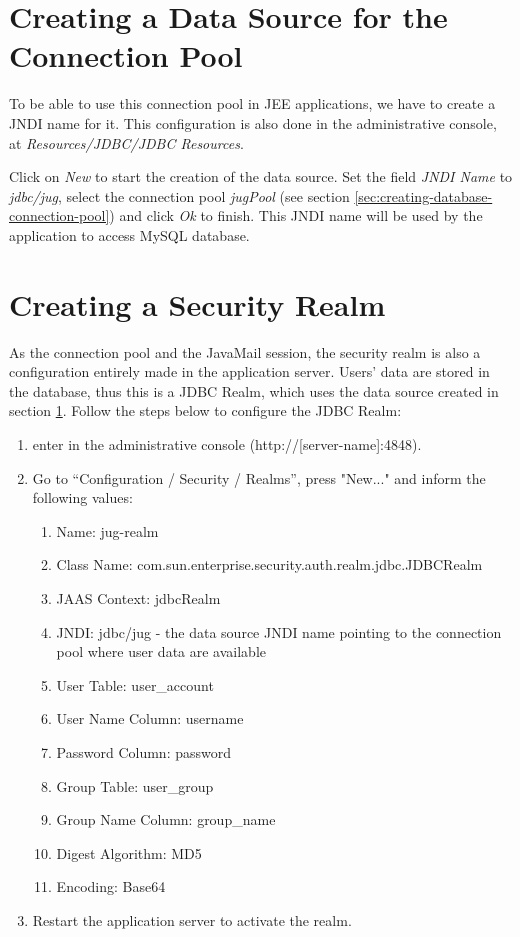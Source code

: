 \documentclass[envcountsame,envcountchap]{svmono}
\begin{document}
\section{Creating a Data Source for the Connection Pool}
\label{sec:creating-data-source-connection-pool}

To be able to use this connection pool in JEE applications, we have to create a JNDI name for it. This configuration is also done in the administrative console, at \textit{Resources/JDBC/JDBC Resources}.

Click on \textit{New} to start the creation of the data source. Set the field \textit{JNDI Name} to \textit{jdbc/jug}, select the connection pool \textit{jugPool} (see section \ref{sec:creating-database-connection-pool}) and click \textit{Ok} to finish. This JNDI name will be used by the application to access MySQL database.

\section{Creating a Security Realm}

As the connection pool and the JavaMail session, the security realm is also a configuration entirely made in the application server. Users' data are stored in the database, thus this is a JDBC Realm, which uses the data source created in section \ref{sec:creating-data-source-connection-pool}. Follow the steps below to configure the JDBC Realm: 

\begin{enumerate}
\item enter in the administrative console (http://[server-name]:4848).
\item Go to “Configuration / Security / Realms”, press "New..." and inform the following values:
   \begin{enumerate}
   \item Name: jug-realm
   \item Class Name: com.sun.enterprise.security.auth.realm.jdbc.JDBCRealm
   \item JAAS Context: jdbcRealm
   \item JNDI: jdbc/jug - the data source JNDI name pointing to the connection pool where user data are available
   \item User Table: user\_account
   \item User Name Column: username
   \item Password Column: password
   \item Group Table: user\_group
   \item Group Name Column: group\_name
   \item Digest Algorithm: MD5
   \item Encoding: Base64
   \end{enumerate}
\item Restart the application server to activate the realm.
\end{enumerate}
\end{document}

